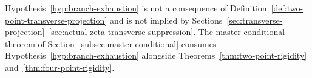 \begin{remark}
\label{rem:branch-exhaustion-status}
Hypothesis~\ref{hyp:branch-exhaustion} is not a consequence of
Definition~\ref{def:two-point-transverse-projection} and is not implied by
Sections~\ref{sec:transverse-projection}--\ref{sec:actual-zeta-transverse-suppression}.
The master conditional theorem of
Section~\ref{subsec:master-conditional} consumes
Hypothesis~\ref{hyp:branch-exhaustion} alongside
Theorems~\ref{thm:two-point-rigidity}
and~\ref{thm:four-point-rigidity}.
\end{remark}

